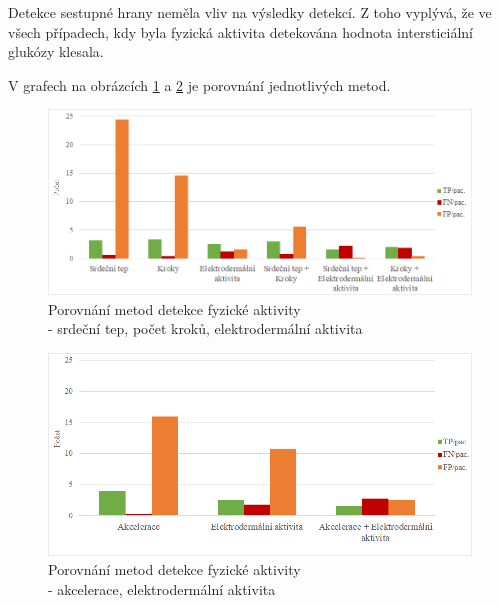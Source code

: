 Detekce sestupné hrany neměla vliv na výsledky detekcí. Z toho vyplývá, že ve všech případech, kdy byla fyzická aktivita detekována hodnota intersticiální glukózy klesala.

V grafech na obrázcích \ref{fig:res_heart} a \ref{fig:res_acc} je porovnání jednotlivých metod.

\begin{figure}[H]
\caption{Porovnání metod detekce fyzické aktivity\\ - srdeční tep, počet kroků, elektrodermální aktivita}
\label{fig:res_heart}
\includegraphics[width=1\textwidth]{img/vysledky/pa/g1.png}
\end{figure}

\begin{figure}[H]
\caption{Porovnání metod detekce fyzické aktivity\\ - akcelerace, elektrodermální aktivita}
\label{fig:res_acc}
\includegraphics[width=1\textwidth]{img/vysledky/pa/g2.png}
\end{figure}